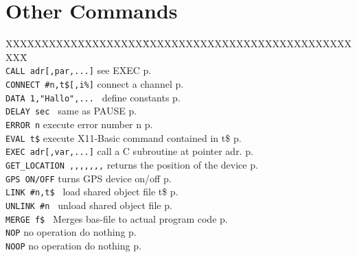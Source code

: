 \section{Other Commands}
\begin{tabbing}
XXXXXXXXXXXXXXXXXXX\=XXXXXXXXXXXXXXXXXXXXXXXXXXXXXXXX\=\kill\\

{\tt CALL adr[,par,...]} \> see EXEC\> p.\pageref{CALL}\\
\verb|CONNECT #n,t$[,i%]|\> connect a channel \> p.\pageref{CONNECT}\\
{\tt DATA 1,"Hallo",...	}\> define constants\> p.\pageref{DATA}\\
\verb|DELAY sec	|        \> same as PAUSE \> p.\pageref{DELAY}\\
\verb|ERROR n|           \> execute error number n\> p.\pageref{ERROR}\\
\verb|EVAL t$|\> execute X11-Basic command contained in t\$\> p.\pageref{EVAL}\\
{\tt EXEC adr[,var,...]}\> call a C subroutine at pointer adr.\> p.\pageref{EXEC}\\
\verb|GET_LOCATION ,,,,,,,|  \> returns the position of the device\> p.\pageref{GETiLOCATION}\\
\verb|GPS ON/OFF|  \> turns GPS device on/off             \> p.\pageref{GPS}\\
{\tt LINK \#n,t\$	}\> load shared object file t\$\> p.\pageref{LINK}\\
{\tt UNLINK \#n	}\> unload shared object file\> p.\pageref{UNLINK}\\
{\tt MERGE f\$		}\> Merges bas-file to actual program code\> p.\pageref{MERGE}\\

\verb|NOP|               \> no operation do nothing\> p.\pageref{NOP}\\
\verb|NOOP|              \> no operation do nothing\> p.\pageref{NOOP}\\


\end{tabbing}
